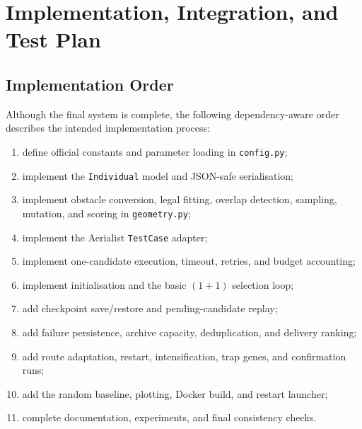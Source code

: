 \documentclass[11pt,a4paper]{report}
\newcommand{\code}[1]{\texttt{#1}}
\begin{document}
\chapter{Implementation, Integration, and Test Plan}

\section{Implementation Order}
Although the final system is complete, the following dependency-aware order describes the intended implementation process:
\begin{enumerate}
  \item define official constants and parameter loading in \code{config.py};
  \item implement the \code{Individual} model and JSON-safe serialisation;
  \item implement obstacle conversion, legal fitting, overlap detection, sampling, mutation, and scoring in \code{geometry.py};
  \item implement the Aerialist \code{TestCase} adapter;
  \item implement one-candidate execution, timeout, retries, and budget accounting;
  \item implement initialisation and the basic $(1+1)$ selection loop;
  \item add checkpoint save/restore and pending-candidate replay;
  \item add failure persistence, archive capacity, deduplication, and delivery ranking;
  \item add route adaptation, restart, intensification, trap genes, and confirmation runs;
  \item add the random baseline, plotting, Docker build, and restart launcher;
  \item complete documentation, experiments, and final consistency checks.
\end{enumerate}
\end{document}
